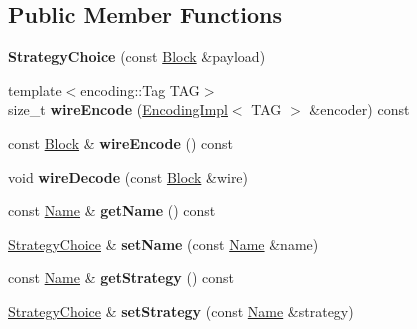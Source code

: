 \subsection*{Public Member Functions}
\begin{DoxyCompactItemize}
\item 
{\bfseries Strategy\+Choice} (const \hyperlink{classndn_1_1Block}{Block} \&payload)\hypertarget{classndn_1_1nfd_1_1StrategyChoice_aee886ea6493c38fbf3c35f421f7fb0db}{}\label{classndn_1_1nfd_1_1StrategyChoice_aee886ea6493c38fbf3c35f421f7fb0db}

\item 
{\footnotesize template$<$encoding\+::\+Tag T\+AG$>$ }\\size\+\_\+t {\bfseries wire\+Encode} (\hyperlink{classndn_1_1encoding_1_1EncodingImpl}{Encoding\+Impl}$<$ T\+AG $>$ \&encoder) const\hypertarget{classndn_1_1nfd_1_1StrategyChoice_a6697271c473509f153e569af3acd828e}{}\label{classndn_1_1nfd_1_1StrategyChoice_a6697271c473509f153e569af3acd828e}

\item 
const \hyperlink{classndn_1_1Block}{Block} \& {\bfseries wire\+Encode} () const\hypertarget{classndn_1_1nfd_1_1StrategyChoice_a1fba33328e53af1439d617abf009da5a}{}\label{classndn_1_1nfd_1_1StrategyChoice_a1fba33328e53af1439d617abf009da5a}

\item 
void {\bfseries wire\+Decode} (const \hyperlink{classndn_1_1Block}{Block} \&wire)\hypertarget{classndn_1_1nfd_1_1StrategyChoice_af5bcf73a53dd9489b1badcc23223d321}{}\label{classndn_1_1nfd_1_1StrategyChoice_af5bcf73a53dd9489b1badcc23223d321}

\item 
const \hyperlink{classndn_1_1Name}{Name} \& {\bfseries get\+Name} () const\hypertarget{classndn_1_1nfd_1_1StrategyChoice_a141d36e9106f4b3eac15f3aaa9cb94f6}{}\label{classndn_1_1nfd_1_1StrategyChoice_a141d36e9106f4b3eac15f3aaa9cb94f6}

\item 
\hyperlink{classndn_1_1nfd_1_1StrategyChoice}{Strategy\+Choice} \& {\bfseries set\+Name} (const \hyperlink{classndn_1_1Name}{Name} \&name)\hypertarget{classndn_1_1nfd_1_1StrategyChoice_a055839eba2e3fc1af4f09b85953f7f23}{}\label{classndn_1_1nfd_1_1StrategyChoice_a055839eba2e3fc1af4f09b85953f7f23}

\item 
const \hyperlink{classndn_1_1Name}{Name} \& {\bfseries get\+Strategy} () const\hypertarget{classndn_1_1nfd_1_1StrategyChoice_a3a14ecb086891998b3fcde070262f3e7}{}\label{classndn_1_1nfd_1_1StrategyChoice_a3a14ecb086891998b3fcde070262f3e7}

\item 
\hyperlink{classndn_1_1nfd_1_1StrategyChoice}{Strategy\+Choice} \& {\bfseries set\+Strategy} (const \hyperlink{classndn_1_1Name}{Name} \&strategy)\hypertarget{classndn_1_1nfd_1_1StrategyChoice_afa6c3485e847b4f7c7407e7285ea84dc}{}\label{classndn_1_1nfd_1_1StrategyChoice_afa6c3485e847b4f7c7407e7285ea84dc}

\end{DoxyCompactItemize}


